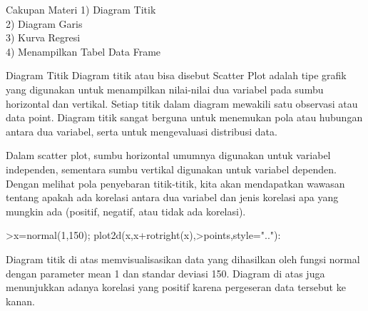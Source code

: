 \documentclass[a4paper,10pt]{article}
\begin{document}
\begin{eulernotebook}
\begin{eulercomment}
\begin{eulercomment}
\begin{eulercomment}
\begin{eulercomment}
\begin{eulercomment}
\begin{eulercomment}
\begin{eulercomment}
\begin{eulercomment}
\begin{eulercomment}
\begin{eulercomment}
\begin{eulercomment}
\begin{eulercomment}
\begin{eulercomment}
\begin{eulercomment}
\begin{eulercomment}
\begin{eulercomment}
\begin{eulercomment}
\begin{eulercomment}
\begin{eulercomment}
Cakupan Materi 1) Diagram Titik\\
2) Diagram Garis\\
3) Kurva Regresi\\
4) Menampilkan Tabel Data Frame

\end{eulercomment}
\eulersubheading{}
\begin{eulercomment}
Diagram Titik Diagram titik atau bisa disebut Scatter Plot adalah tipe
grafik yang digunakan untuk menampilkan nilai-nilai dua variabel pada
sumbu horizontal dan vertikal. Setiap titik dalam diagram mewakili
satu observasi atau data point. Diagram titik sangat berguna untuk
menemukan pola atau hubungan antara dua variabel, serta untuk
mengevaluasi distribusi data.

Dalam scatter plot, sumbu horizontal umumnya digunakan untuk variabel
independen, sementara sumbu vertikal digunakan untuk variabel
dependen. Dengan melihat pola penyebaran titik-titik, kita akan
mendapatkan wawasan tentang apakah ada korelasi antara dua variabel
dan jenis korelasi apa yang mungkin ada (positif, negatif, atau tidak
ada korelasi).

\end{eulercomment}
\begin{eulerprompt}
>x=normal(1,150); plot2d(x,x+rotright(x),>points,style=".."):
\end{eulerprompt}
\begin{eulercomment}
Diagram titik di atas memvisualisasikan data yang dihasilkan oleh
fungsi normal dengan parameter mean 1 dan standar deviasi 150. Diagram
di atas juga menunjukkan adanya korelasi yang positif karena
pergeseran data tersebut ke kanan.


\end{eulercomment}
\end{eulercomment}
\end{eulercomment}
\end{eulercomment}
\end{eulercomment}
\end{eulercomment}
\end{eulercomment}
\end{eulercomment}
\end{eulercomment}
\end{eulercomment}
\end{eulercomment}
\end{eulercomment}
\end{eulercomment}
\end{eulercomment}
\end{eulercomment}
\end{eulercomment}
\end{eulercomment}
\end{eulercomment}
\end{eulercomment}
\end{eulernotebook}
\end{document}
